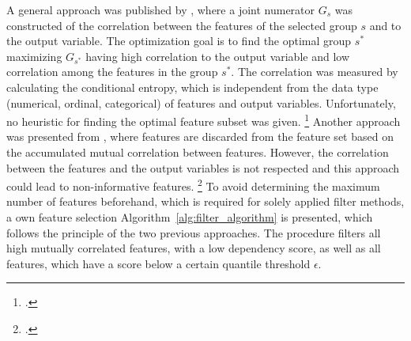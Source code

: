 A general approach was published by \cite{hall_feature_1997},
where a joint numerator $G_s$ was constructed of the correlation between the features of the selected group $s$ and to the output variable.
The optimization goal is to find the optimal group $s^*$ maximizing $G_{s^*}$ having high correlation to the output variable and low
correlation among the features in the group $s^*$. The correlation was measured by calculating the conditional entropy, which is independent
from the data type (numerical, ordinal, categorical) of features and output variables. Unfortunately, no heuristic for finding the optimal
feature subset was given. \footcite[cf.][p.856]{hall_feature_1997} Another approach was presented from \cite{haindl_feature_2006},
where features are discarded from the feature set based on the accumulated mutual correlation between features. However, the correlation between
the features and the output variables is not respected and this approach could lead to non-informative features. \footcite[cf.][]{haindl_feature_2006}
To avoid determining the maximum number of features beforehand, which is required for solely applied filter methods,
a own feature selection Algorithm~\ref{alg:filter_algorithm} is presented, which follows the principle of the two previous approaches.
The procedure filters all  high mutually correlated features, with a low dependency score,  as well as all features, which have a
score below a certain quantile threshold $\epsilon$.



